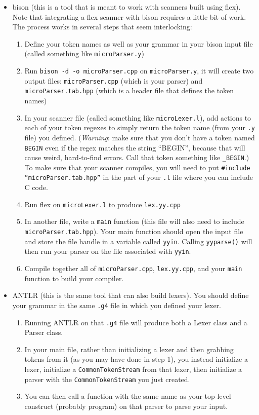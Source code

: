 \documentclass{article}
\begin{document}
\begin{itemize}
	\item	bison (this is a tool that is meant to work with scanners built using flex). Note that integrating a flex scanner with bison requires a little bit of work. The process works in several steps that seem interlocking: 
		\begin{enumerate}
			\item Define your token names as well as your grammar in your bison input file (called something like \texttt{microParser.y})
			\item Run \texttt{bison -d -o microParser.cpp} on \texttt{microParser.y}, it will create two output files: \texttt{microParser.cpp} (which is your parser) and \texttt{microParser.tab.hpp} (which is a header file that defines the token names)
			\item In your scanner file (called something like \texttt{microLexer.l}), add actions to each of your token regexes to simply return the token name (from your \texttt{.y} file) you defined. ({\em Warning}: make sure that you don't have a token named \texttt{BEGIN} even if the regex matches the string ``BEGIN'', because that will cause weird, hard-to-find errors. Call that token something like \texttt{\_BEGIN}.) To make sure that your scanner compiles, you will need to put \texttt{\#include ``microParser.tab.hpp''} in the part of your \texttt{.l} file where you can include C code.
			\item Run flex on \texttt{microLexer.l} to produce \texttt{lex.yy.cpp}
			\item In another file, write a \texttt{main} function (this file will also need to include \texttt{microParser.tab.hpp}). Your main function should open the input file and store the file handle in a variable called \texttt{yyin}. Calling \texttt{yyparse()} will then run your parser on the file associated with \texttt{yyin}.
			\item Compile together all of \texttt{microParser.cpp}, \texttt{lex.yy.cpp}, and your \texttt{main} function to build your compiler.
		\end{enumerate}

	\item ANTLR (this is the same tool that can also build lexers). You should define your grammar in the same \texttt{.g4} file in which you defined your lexer. 
		\begin{enumerate}
			\item Running ANTLR on that \texttt{.g4} file will produce both a Lexer class and a Parser class. 
			\item In your main file, rather than initializing a lexer and then grabbing tokens from it (as you may have done in step 1), you instead initialize a lexer, initialize a \texttt{CommonTokenStream} from that lexer, then initialize a parser with the \texttt{CommonTokenStream} you just created. 
			\item You can then call a function with the same name as your top-level construct (probably program) on that parser to parse your input.
		\end{enumerate}
\end{itemize}
\end{document}
